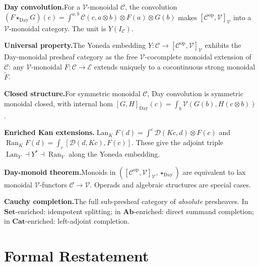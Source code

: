 \begin{summarybox}
\textbf{Day convolution.}\quad For a $\mathcal{V}$-monoidal $\mathcal{C}$,
the convolution $(F \star_{\mathrm{Day}} G)(c) = \int^{a, b} \mathcal{C}(c,
a \otimes b) \otimes F(a) \otimes G(b)$ makes $[\mathcal{C}^{\mathrm{op}},
\mathcal{V}]_\mathcal{V}$ into a $\mathcal{V}$-monoidal category. The unit is
$Y(I_\mathcal{C})$.

\textbf{Universal property.}\quad The Yoneda embedding $Y : \mathcal{C} \to
[\mathcal{C}^{\mathrm{op}}, \mathcal{V}]_\mathcal{V}$ exhibits the
Day-monoidal presheaf category as the free $\mathcal{V}$-cocomplete monoidal
extension of $\mathcal{C}$: any $\mathcal{V}$-monoidal $F : \mathcal{C} \to
\mathcal{E}$ extends uniquely to a cocontinuous strong monoidal $\widetilde F$.

\textbf{Closed structure.}\quad For symmetric monoidal $\mathcal{C}$, Day
convolution is symmetric monoidal closed, with internal hom $[G, H]_{\mathrm{Day}}(c)
= \int_b \mathcal{V}(G(b), H(c \otimes b))$.

\textbf{Enriched Kan extensions.}\quad $\operatorname{Lan}_K F (d) = \int^c
\mathcal{D}(K c, d) \otimes F(c)$ and $\operatorname{Ran}_K F (d) = \int_c
[\mathcal{D}(d, K c), F(c)]$. These give the adjoint triple
$\operatorname{Lan}_Y \dashv Y^* \dashv \operatorname{Ran}_Y$ along the
Yoneda embedding.

\textbf{Day-monoid theorem.}\quad Monoids in $([\mathcal{C}^{\mathrm{op}},
\mathcal{V}]_\mathcal{V}, \star_{\mathrm{Day}})$ are equivalent to lax
monoidal $\mathcal{V}$-functors $\mathcal{C} \to \mathcal{V}$. Operads and
algebraic structures are special cases.

\textbf{Cauchy completion.}\quad The full sub-presheaf category of
\emph{absolute} presheaves. In $\mathbf{Set}$-enriched: idempotent splitting;
in $\mathbf{Ab}$-enriched: direct summand completion; in $\mathbf{Cat}$-enriched:
left-adjoint completion.
\end{summarybox}


\section*{Formal Restatement}

